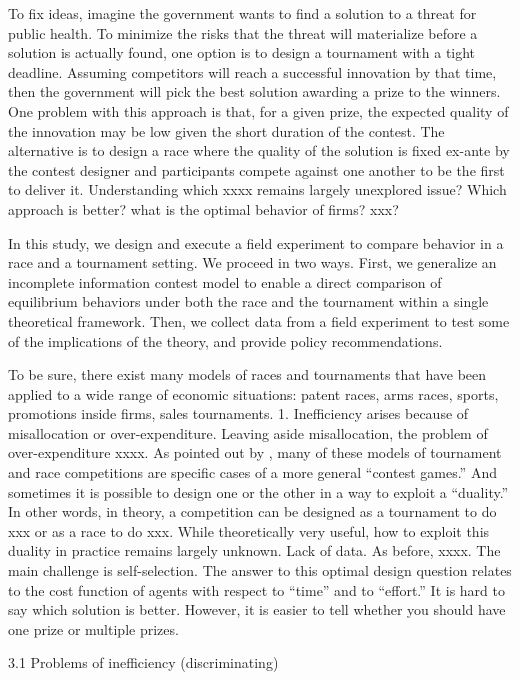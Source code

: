 \documentclass[12pt,]{article}
\begin{document}
To fix ideas, imagine the government wants to find a solution to a
threat for public health. To minimize the risks that the threat will
materialize before a solution is actually found, one option is to design
a tournament with a tight deadline. Assuming competitors will reach a
successful innovation by that time, then the government will pick the
best solution awarding a prize to the winners. One problem with this
approach is that, for a given prize, the expected quality of the
innovation may be low given the short duration of the contest. The
alternative is to design a race where the quality of the solution is
fixed ex-ante by the contest designer and participants compete against
one another to be the first to deliver it. Understanding which xxxx
remains largely unexplored issue? Which approach is better? what is the
optimal behavior of firms? xxx?

In this study, we design and execute a field experiment to compare
behavior in a race and a tournament setting. We proceed in two ways.
First, we generalize an incomplete information contest model
\citep{moldovanu2001optimal} to enable a direct comparison of
equilibrium behaviors under both the race and the tournament within a
single theoretical framework. Then, we collect data from a field
experiment to test some of the implications of the theory, and provide
policy recommendations.

To be sure, there exist many models of races and tournaments that have
been applied to a wide range of economic situations: patent races, arms
races, sports, promotions inside firms, sales tournaments. 1.
Inefficiency arises because of misallocation or over-expenditure.
Leaving aside misallocation, the problem of over-expenditure xxxx. As
pointed out by \citet{baye2003strategic}, many of these models of
tournament and race competitions are specific cases of a more general
``contest games.'' And sometimes it is possible to design one or the
other in a way to exploit a ``duality.'' In other words, in theory, a
competition can be designed as a tournament to do xxx or as a race to do
xxx. While theoretically very useful, how to exploit this duality in
practice remains largely unknown. Lack of data. As before, xxxx. The
main challenge is self-selection. The answer to this optimal design
question relates to the cost function of agents with respect to ``time''
and to ``effort.'' It is hard to say which solution is better. However,
it is easier to tell whether you should have one prize or multiple
prizes.

3.1 Problems of inefficiency (discriminating)
\end{document}
